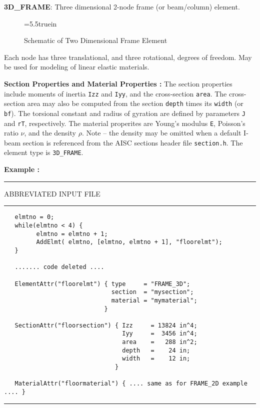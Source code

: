\clearpage
\vspace{0.15 in}\noindent
{\bf 3D\_FRAME}: Three dimensional 2-node frame (or beam/column) element.

\begin{figure} [ht]
\epsfxsize=5.5truein
\centerline{}
\caption{Schematic of Two Dimensional Frame Element}
\label{fig:fe-3d-frame}
\end{figure}

\vspace{0.15 in}\noindent
Each node has three translational, and three rotational, degrees of freedom.
May be used for modeling of linear elastic materials.  

\vspace{0.10 in}\noindent
{\bf Section Properties and Material Properties :} 
The section properties include moments of inertia {\tt Izz} and {\tt Iyy},
and the cross-section {\tt area}. The cross-section area may also be
computed from the section {\tt depth} times its {\tt width} (or {\tt bf}).
The torsional constant and radius of gyration are defined
by parameters {\tt J} and {\tt rT}, respectively.
The material properites are Young's modulus {\tt E},
Poisson's ratio $\nu$, and the density $\rho$.
Note -- the density may be omitted when a default I-beam section
is referenced from the AISC sections header file {\tt section.h}.
The element type is {\tt 3D\_FRAME}.

\vspace{0.10 in}\noindent
{\bf Example :} 

\vspace{0.10 in}
\begin{footnotesize}
\noindent
{\rule{2.1 in}{0.035 in} ABBREVIATED INPUT FILE \rule{2.1 in}{0.035 in} }
\begin{verbatim}
   elmtno = 0;
   while(elmtno < 4) {
         elmtno = elmtno + 1;
         AddElmt( elmtno, [elmtno, elmtno + 1], "floorelmt");
   }

   ....... code deleted .... 

   ElementAttr("floorelmt") { type     = "FRAME_3D";
                              section  = "mysection";
                              material = "mymaterial";
                            }

   SectionAttr("floorsection") { Izz     = 13824 in^4;
                                 Iyy     =  3456 in^4;
                                 area    =   288 in^2;
                                 depth   =    24 in;
                                 width   =    12 in;
                               }

   MaterialAttr("floormaterial") { .... same as for FRAME_2D example .... }

\end{verbatim}
\rule{6.25 in}{0.035 in}
\end{footnotesize}

